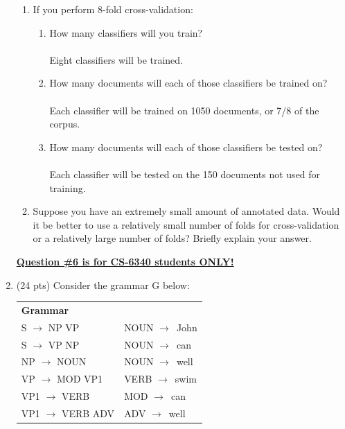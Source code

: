 \documentclass[11pt]{article}
\newcommand{\ra}{$\rightarrow$~}
\begin{document}
\begin{enumerate}
\begin{enumerate}
\item If you perform 8-fold cross-validation:
\begin{enumerate}
\item How many classifiers will you train?\\ ~ \\
Eight classifiers will be trained.\\
\item How many documents will each of those classifiers be trained on? \\ ~ \\
Each classifier will be trained on 1050 documents, or 7/8 of the corpus.\\
\item How many documents will each of those classifiers be tested on?\\ ~ \\
Each classifier will be tested on the 150 documents not used for training.\\
\end{enumerate}

\item Suppose you have an extremely small amount of annotated data. 
  Would it be better to use a relatively small number of folds for
  cross-validation or a relatively large number of folds? Briefly explain your
  answer.

\end{enumerate}


\newpage
\underline{\textbf{Question \#6 is for CS-6340 students ONLY!}}  \\

\item (24 pts) Consider the grammar G below:

\begin{center}
\begin{tabular}{|ll|} \hline
\textbf{Grammar} & ~ \\  
S $\rightarrow$ NP VP    & NOUN \ra John \\
S $\rightarrow$ VP NP    & NOUN \ra can \\
NP $\rightarrow$ NOUN    & NOUN \ra well \\
VP $\rightarrow$ MOD VP1 & VERB \ra swim \\
VP1 $\rightarrow$ VERB   & MOD \ra can \\
VP1 $\rightarrow$ VERB ADV & ADV \ra well \\  \hline
\end{tabular}
\end{center}


\end{enumerate}
\end{document}
